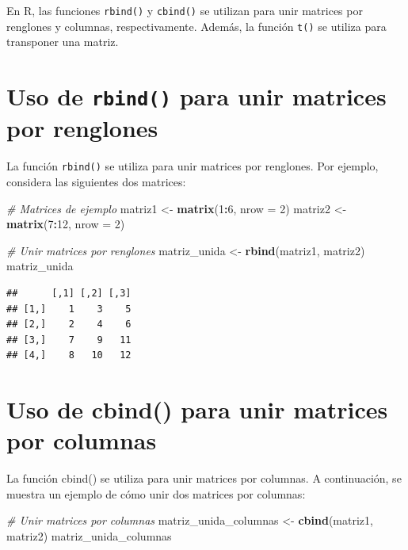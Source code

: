 \documentclass[
]{book}
\newenvironment{Shaded}{\begin{snugshade}}{\end{snugshade}}
\newcommand{\AttributeTok}[1]{\textcolor[rgb]{0.13,0.29,0.53}{#1}}
\newcommand{\CommentTok}[1]{\textcolor[rgb]{0.56,0.35,0.01}{\textit{#1}}}
\newcommand{\DecValTok}[1]{\textcolor[rgb]{0.00,0.00,0.81}{#1}}
\newcommand{\FunctionTok}[1]{\textcolor[rgb]{0.13,0.29,0.53}{\textbf{#1}}}
\newcommand{\NormalTok}[1]{#1}
\newcommand{\OtherTok}[1]{\textcolor[rgb]{0.56,0.35,0.01}{#1}}
\newcommand{\SpecialCharTok}[1]{\textcolor[rgb]{0.81,0.36,0.00}{\textbf{#1}}}
\begin{document}
En R, las funciones \texttt{rbind()} y \texttt{cbind()} se utilizan para unir matrices por renglones y columnas, respectivamente. Además, la función \texttt{t()} se utiliza para transponer una matriz.

\section{\texorpdfstring{Uso de \texttt{rbind()} para unir matrices por renglones}{Uso de rbind() para unir matrices por renglones}}\label{uso-de-rbind-para-unir-matrices-por-renglones}

La función \texttt{rbind()} se utiliza para unir matrices por renglones. Por ejemplo, considera las siguientes dos matrices:

\begin{Shaded}
\begin{Highlighting}[]
\CommentTok{\# Matrices de ejemplo}
\NormalTok{matriz1 }\OtherTok{\textless{}{-}} \FunctionTok{matrix}\NormalTok{(}\DecValTok{1}\SpecialCharTok{:}\DecValTok{6}\NormalTok{, }\AttributeTok{nrow =} \DecValTok{2}\NormalTok{)}
\NormalTok{matriz2 }\OtherTok{\textless{}{-}} \FunctionTok{matrix}\NormalTok{(}\DecValTok{7}\SpecialCharTok{:}\DecValTok{12}\NormalTok{, }\AttributeTok{nrow =} \DecValTok{2}\NormalTok{)}

\CommentTok{\# Unir matrices por renglones}
\NormalTok{matriz\_unida }\OtherTok{\textless{}{-}} \FunctionTok{rbind}\NormalTok{(matriz1, matriz2)}
\NormalTok{matriz\_unida}
\end{Highlighting}
\end{Shaded}

\begin{verbatim}
##      [,1] [,2] [,3]
## [1,]    1    3    5
## [2,]    2    4    6
## [3,]    7    9   11
## [4,]    8   10   12
\end{verbatim}

\section{Uso de cbind() para unir matrices por columnas}\label{uso-de-cbind-para-unir-matrices-por-columnas}

La función cbind() se utiliza para unir matrices por columnas. A continuación, se muestra un ejemplo de cómo unir dos matrices por columnas:

\begin{Shaded}
\begin{Highlighting}[]
\CommentTok{\# Unir matrices por columnas}
\NormalTok{matriz\_unida\_columnas }\OtherTok{\textless{}{-}} \FunctionTok{cbind}\NormalTok{(matriz1, matriz2)}
\NormalTok{matriz\_unida\_columnas}
\end{Highlighting}
\end{Shaded}
\end{document}
